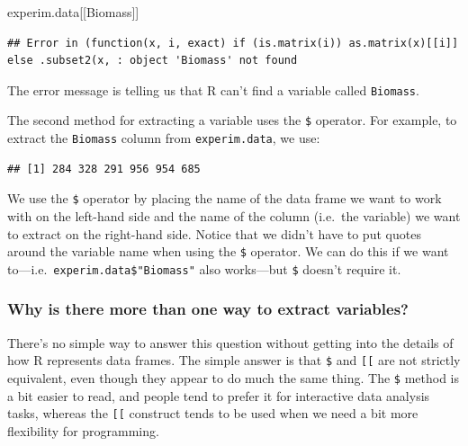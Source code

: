 \documentclass[
]{book}
\newenvironment{Shaded}{\begin{snugshade}}{\end{snugshade}}
\newcommand{\NormalTok}[1]{#1}
\newcommand{\SpecialCharTok}[1]{\textcolor[rgb]{0.00,0.00,0.00}{#1}}
\newenvironment{greybox}{
  \definecolor{shadecolor}{rgb}{0.95,0.95,0.95}  %
  \color{black}
  \begin{shaded}}
 {\end{shaded}}
\newenvironment{infobox}[1]
  {
  \begin{itemize}
  \renewcommand{\labelitemi}{
    \raisebox{-.7\height}[0pt][0pt]{
      {\setkeys{Gin}{width=3em,keepaspectratio}
        \texttt{[image: images/\#1]}}
    }
  }
  \setlength{\fboxsep}{1em}
  \begin{greybox}
  \item
  }
  {
  \end{greybox}
  \end{itemize}
  }
\begin{document}
\begin{Shaded}
\begin{Highlighting}[]
\NormalTok{experim.data[[Biomass]]}
\end{Highlighting}
\end{Shaded}

\begin{verbatim}
## Error in (function(x, i, exact) if (is.matrix(i)) as.matrix(x)[[i]] else .subset2(x, : object 'Biomass' not found
\end{verbatim}

The error message is telling us that R can't find a variable called \texttt{Biomass}.

The second method for extracting a variable uses the \texttt{\$} operator. For example, to extract the \texttt{Biomass} column from \texttt{experim.data}, we use:

\begin{Shaded}
\end{Shaded}

\begin{verbatim}
## [1] 284 328 291 956 954 685
\end{verbatim}

We use the \texttt{\$} operator by placing the name of the data frame we want to work with on the left-hand side and the name of the column (i.e.~the variable) we want to extract on the right-hand side. Notice that we didn't have to put quotes around the variable name when using the \texttt{\$} operator. We can do this if we want to---i.e.~\texttt{experim.data\$"Biomass"} also works---but \texttt{\$} doesn't require it.

\begin{infobox}{warning}

\hypertarget{why-is-there-more-than-one-way-to-extract-variables}{%
\subsubsection*{Why is there more than one way to extract variables?}\label{why-is-there-more-than-one-way-to-extract-variables}}

There's no simple way to answer this question without getting into the details of how R represents data frames. The simple answer is that \texttt{\$} and \texttt{{[}{[}} are not strictly equivalent, even though they appear to do much the same thing. The \texttt{\$} method is a bit easier to read, and people tend to prefer it for interactive data analysis tasks, whereas the \texttt{{[}{[}} construct tends to be used when we need a bit more flexibility for programming.

\end{infobox}
\end{document}
